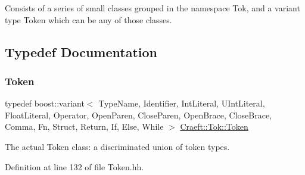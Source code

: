 Consists of a series of small classes grouped in the namespace {\ttfamily Tok}, and a variant type {\ttfamily Token} which can be any of those classes. 

\subsection{Typedef Documentation}
\hypertarget{_token_8hh_file_a521c5743a63e2d5d1871557794e0a8b1}{}\label{_token_8hh_file_a521c5743a63e2d5d1871557794e0a8b1} 
\subsubsection{\texorpdfstring{Token}{Token}}
{\footnotesize\ttfamily typedef boost\+::variant$<$ Type\+Name, Identifier, Int\+Literal, U\+Int\+Literal, Float\+Literal, Operator, Open\+Paren, Close\+Paren, Open\+Brace, Close\+Brace, Comma, Fn, Struct, Return, If, Else, While $>$ \hyperlink{_token_8hh_a521c5743a63e2d5d1871557794e0a8b1}{Craeft\+::\+Tok\+::\+Token}}

The actual {\ttfamily Token} class\+: a discriminated union of token types. 

Definition at line 132 of file Token.\+hh.

